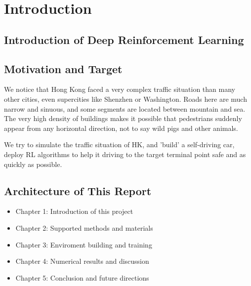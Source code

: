 
\chapter{Introduction} %

\label{Chapter1} %


\newcommand{\keyword}[1]{\textbf{#1}}
\newcommand{\tabhead}[1]{\textbf{#1}}
\newcommand{\code}[1]{\texttt{#1}}
\newcommand{\file}[1]{\texttt{\bfseries#1}}
\newcommand{\option}[1]{\texttt{\itshape#1}}


\section{Introduction of Deep Reinforcement Learning}

\section{Motivation and Target}

We notice that Hong Kong faced a very complex traffic situation than many other cities, even supercities like Shenzhen or Washington. Roads here are much narrow and sinuous, and some segments are located between mountain and sea. The very high density of buildings makes it possible that pedestrians suddenly appear from any horizontal direction, not to say wild pigs and other animals.

We try to simulate the traffic situation of HK, and 'build' a self-driving car, deploy RL algorithms to help it driving to the target terminal point safe and as quickly as possible.


\section{Architecture of This Report}

\begin{itemize}
\item Chapter 1: Introduction of this project
\item Chapter 2: Supported methods and materials
\item Chapter 3: Enviroment building and training 
\item Chapter 4: Numerical results and discussion
\item Chapter 5: Conclusion and future directions
\end{itemize}
